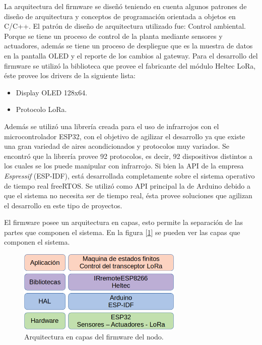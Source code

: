 La arquitectura del firmware se diseñó teniendo en cuenta algunos patrones de diseño de arquitectura y conceptos de programación orientada a objetos en C/C++.
El patrón de diseño de arquitectura utilizado fue: Control ambiental. Porque se tiene un proceso de control de la planta mediante sensores y actuadores, además se tiene un proceso de despliegue que es la muestra de datos en la pantalla OLED y el reporte de los cambios al gateway.
Para el desarrollo del firmware se utilizó la biblioteca que provee el fabricante del módulo Heltec LoRa, éste provee los drivers de la siguiente lista:

\begin{itemize}
\item Display OLED 128x64.
\item Protocolo LoRa.
\end{itemize}

Además se utilizó una librería creada para el uso de infrarrojos con el microcontrolador ESP32, con el objetivo de agilizar el desarrollo ya que existe una gran variedad de aires acondicionados y protocolos muy variados. Se encontró que la librería provee 92 protocolos, es decir, 92 dispositivos distintos a los cuales se los puede manipular con infrarrojo. Si bien la API de la empresa {\textit{Espressif}} (ESP-IDF), está desarrollada completamente sobre el sistema operativo de tiempo real freeRTOS. Se utilizó como API principal la de Arduino debido a que el sistema no necesita ser de tiempo real, ésta provee soluciones que agilizan el desarrollo en este tipo de proyectos.

El firmware posee un arquitectura en capas, esto permite la separación de las partes que componen el sistema. En la figura [\ref{fig:capas}] se pueden ver las capas que componen el sistema.

\begin{figure}[h!]
	\centering
	\includegraphics[width=0.7\textwidth]{./Figures/capas.png}
	\caption{Arquitectura en capas del firmware del nodo.}
	\label{fig:capas}
\end{figure}

